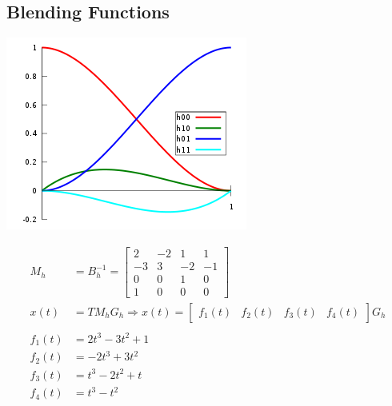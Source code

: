 \documentclass{article}
\begin{document}
\subsection*{Blending Functions}
\begin{center}
    \includegraphics*[scale=0.7]{W3_8.png}
\end{center}
\begin{align*}
M_h &= B_h ^{-1} = \begin{bmatrix} 2 & -2 & 1 & 1 \\ -3 & 3 & -2 & -1 \\ 0 & 0 & 1 & 0 \\ 1 & 0 & 0 & 0\end{bmatrix}\\
x(t) &= T M_h G_h \Rightarrow x(t) = \begin{bmatrix} f_1 (t) & f_2 (t) & f_3 (t) & f_4 (t) \end{bmatrix} G_h\\
& \\
f_1(t) &= 2t^3 - 3t^2 + 1\\
f_2(t) &= -2t^3 + 3t^2\\
f_3(t) &= t^3 - 2t^2 + t\\
f_4(t) &= t^3 - t^2
\end{align*}
\end{document}
